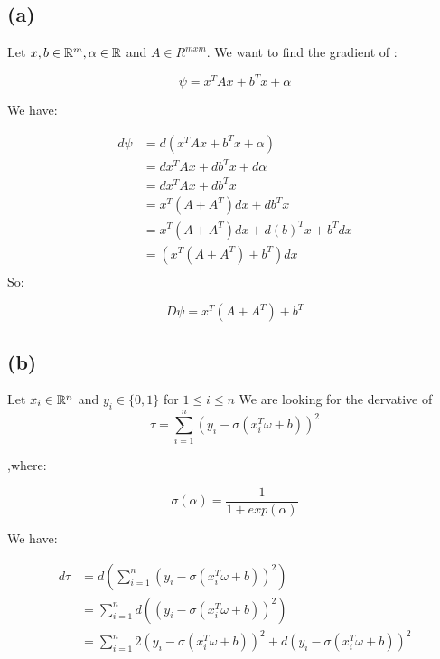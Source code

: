 
\subsection*{(a)}

    Let $x,b \in \mathbb{R}^m, \alpha \in \mathbb{R}$ and $A \in R^{mxm}$. We want to find the gradient of :
    
    \[
    \psi = x^TAx+ b^Tx+\alpha    
    \]

    We have:

    \begin{align*}
        d\psi   &= d(x^TAx+b^Tx+\alpha)\\
                &= dx^TAx+db^Tx+d\alpha\\
                &= dx^TAx+db^Tx\\
                &= x^T(A+A^T)dx +db^Tx \\
                &= x^T(A+A^T)dx +d(b)^Tx+b^Tdx \\
                &= (x^T(A+A^T)+b^T)dx\\
    \end{align*}
So:

\[
D\psi= x^T(A+A^T)+b^T   
\]

\subsection*{(b)}
Let $x_i \in \mathbb{R}^n$ and $y_i \in \{0,1\}$ for $1 \leq i \leq n$ We are looking for the dervative of 
\[
\tau = \sum_{i=1}^n(y_i-\sigma(x_i^T\omega +b))^2 
\]

,where:

\[
\sigma(\alpha) = \frac{1}{1+exp(\alpha)} 
\]

We have:

\begin{align*}
    d\tau   &=d(\sum_{i=1}^n(y_i-\sigma(x_i^T\omega +b))^2 ) \\
            &= \sum_{i=1}^nd((y_i-\sigma(x_i^T\omega +b))^2) \\
            &=\sum_{i=1}^n2(y_i-\sigma(x_i^T\omega +b))^2 +d(y_i-\sigma(x_i^T\omega +b))^2  \\
\end{align*}


